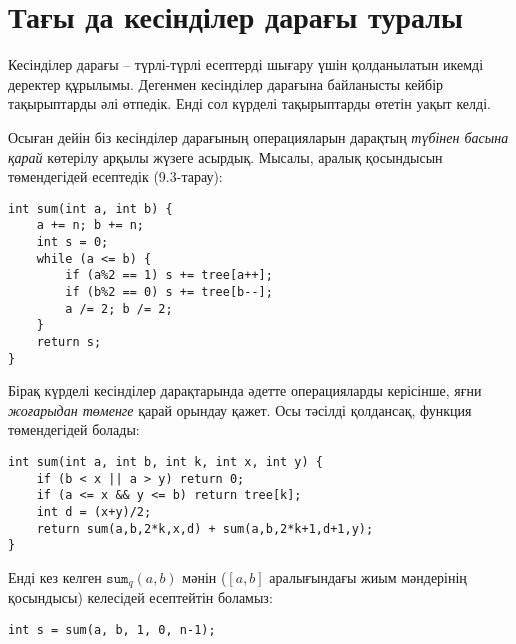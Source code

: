 \chapter{Тағы да кесінділер дарағы туралы}


Кесінділер дарағы -- түрлі-түрлі есептерді шығару үшін қолданылатын 
икемді деректер құрылымы. Дегенмен кесінділер дарағына байланысты
кейбір тақырыптарды әлі өтпедік. Енді сол күрделі тақырыптарды өтетін уақыт
келді.


Осыған дейін біз кесінділер дарағының операцияларын 
дарақтың \emph{түбінен басына қарай} көтерілу арқылы жүзеге асырдық. 
Мысалы, аралық қосындысын төмендегідей есептедік (9.3-тарау):


\begin{lstlisting}
int sum(int a, int b) {
    a += n; b += n;
    int s = 0;
    while (a <= b) {
        if (a%2 == 1) s += tree[a++];
        if (b%2 == 0) s += tree[b--];
        a /= 2; b /= 2;
    }
    return s;
}
\end{lstlisting}

Бірақ күрделі кесінділер дарақтарында әдетте 
операцияларды керісінше, 
яғни \emph{жоғарыдан төменге} қарай орындау қажет. Осы тәсілді
қолдансақ, функция төмендегідей болады:

\begin{lstlisting}
int sum(int a, int b, int k, int x, int y) {
    if (b < x || a > y) return 0;
    if (a <= x && y <= b) return tree[k];
    int d = (x+y)/2;
    return sum(a,b,2*k,x,d) + sum(a,b,2*k+1,d+1,y);
}
\end{lstlisting}

Енді кез келген $\texttt{sum}_q(a,b)$ мәнін 
($[a,b]$ аралығындағы жиым мәндерінің қосындысы)
келесідей есептейтін боламыз:
\begin{lstlisting}
int s = sum(a, b, 1, 0, n-1);
\end{lstlisting}


